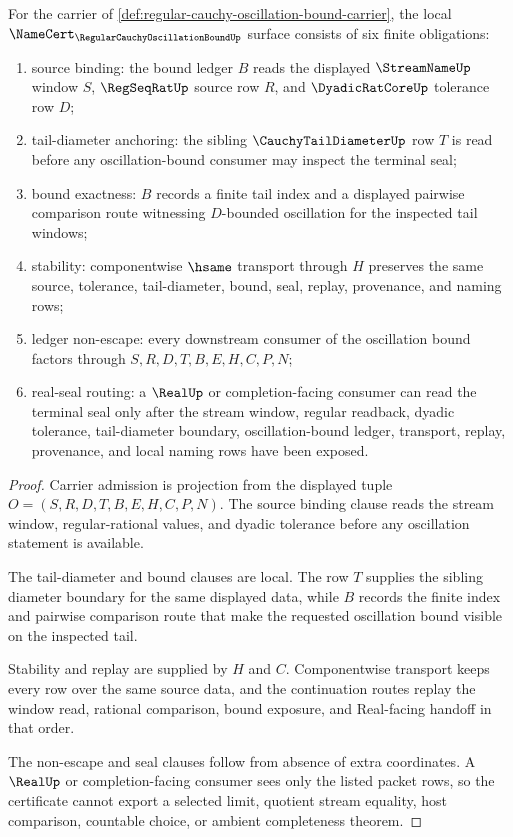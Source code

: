 \begin{theorem}
\label{thm:regular-cauchy-oscillation-bound-namecert-obligations}
For the carrier of \autoref{def:regular-cauchy-oscillation-bound-carrier}, the local $\NameCert_{\RegularCauchyOscillationBoundUp}$ surface consists of six finite obligations:
\begin{enumerate}
\item source binding: the bound ledger $B$ reads the displayed $\StreamNameUp$ window $S$, $\RegSeqRatUp$ source row $R$, and $\DyadicRatCoreUp$ tolerance row $D$;
\item tail-diameter anchoring: the sibling $\CauchyTailDiameterUp$ row $T$ is read before any oscillation-bound consumer may inspect the terminal seal;
\item bound exactness: $B$ records a finite tail index and a displayed pairwise comparison route witnessing $D$-bounded oscillation for the inspected tail windows;
\item stability: componentwise $\hsame$ transport through $H$ preserves the same source, tolerance, tail-diameter, bound, seal, replay, provenance, and naming rows;
\item ledger non-escape: every downstream consumer of the oscillation bound factors through $S,R,D,T,B,E,H,C,P,N$;
\item real-seal routing: a $\RealUp$ or completion-facing consumer can read the terminal seal only after the stream window, regular readback, dyadic tolerance, tail-diameter boundary, oscillation-bound ledger, transport, replay, provenance, and local naming rows have been exposed.
\end{enumerate}
\end{theorem}
\begin{proof}
Carrier admission is projection from the displayed tuple $O=(S,R,D,T,B,E,H,C,P,N)$. The source binding clause reads the stream window, regular-rational values, and dyadic tolerance before any oscillation statement is available.

The tail-diameter and bound clauses are local. The row $T$ supplies the sibling diameter boundary for the same displayed data, while $B$ records the finite index and pairwise comparison route that make the requested oscillation bound visible on the inspected tail.

Stability and replay are supplied by $H$ and $C$. Componentwise transport keeps every row over the same source data, and the continuation routes replay the window read, rational comparison, bound exposure, and Real-facing handoff in that order.

The non-escape and seal clauses follow from absence of extra coordinates. A $\RealUp$ or completion-facing consumer sees only the listed packet rows, so the certificate cannot export a selected limit, quotient stream equality, host comparison, countable choice, or ambient completeness theorem.
\end{proof}

